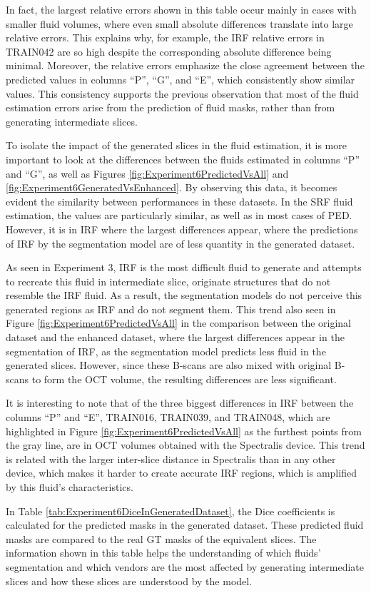 \par
In fact, the largest relative errors shown in this table occur mainly in cases with smaller fluid volumes, where even small absolute differences translate into large relative errors. This explains why, for example, the IRF relative errors in TRAIN042 are so high despite the corresponding absolute difference being minimal. Moreover, the relative errors emphasize the close agreement between the predicted values in columns ``P'', ``G'', and ``E'', which consistently show similar values. This consistency supports the previous observation that most of the fluid estimation errors arise from the prediction of fluid masks, rather than from generating intermediate slices.
\par
To isolate the impact of the generated slices in the fluid estimation, it is more important to look at the differences between the fluids estimated in columns ``P'' and ``G'', as well as Figures \ref{fig:Experiment6PredictedVsAll} and \ref{fig:Experiment6GeneratedVsEnhanced}. By observing this data, it becomes evident the similarity between performances in these datasets. In the SRF fluid estimation, the values are particularly similar, as well as in most cases of PED. However, it is in IRF where the largest differences appear, where the predictions of IRF by the segmentation model are of less quantity in the generated dataset.
\par
As seen in Experiment 3, IRF is the most difficult fluid to generate and attempts to recreate this fluid in intermediate slice, originate structures that do not resemble the IRF fluid. As a result, the segmentation models do not perceive this generated regions as IRF and do not segment them. This trend also seen in Figure \ref{fig:Experiment6PredictedVsAll} in the comparison between the original dataset and the enhanced dataset, where the largest differences appear in the segmentation of IRF, as the segmentation model predicts less fluid in the generated slices. However, since these B-scans are also mixed with original B-scans to form the OCT volume, the resulting differences are less significant.
\par
It is interesting to note that of the three biggest differences in IRF between the columns ``P'' and ``E'', TRAIN016, TRAIN039, and TRAIN048, which are highlighted in Figure \ref{fig:Experiment6PredictedVsAll} as the furthest points from the gray line, are in OCT volumes obtained with the Spectralis device. This trend is related with the larger inter-slice distance in Spectralis than in any other device, which makes it harder to create accurate IRF regions, which is amplified by this fluid's characteristics.
\par
In Table \ref{tab:Experiment6DiceInGeneratedDataset}, the Dice coefficients is calculated for the predicted masks in the generated dataset. These predicted fluid masks are compared to the real GT masks of the equivalent slices. The information shown in this table helps the understanding of which fluids' segmentation and which vendors are the most affected by generating intermediate slices and how these slices are understood by the model.

